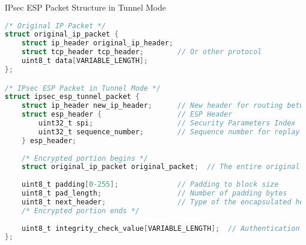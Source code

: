 \begin{code}{IPsec ESP Packet Structure in Tunnel Mode}\\
\begin{lstlisting}[language=C, style=basesmol]
/* Original IP Packet */
struct original_ip_packet {
    struct ip_header original_ip_header;
    struct tcp_header tcp_header;        // Or other protocol
    uint8_t data[VARIABLE_LENGTH];
};

/* IPsec ESP Packet in Tunnel Mode */
struct ipsec_esp_tunnel_packet {
    struct ip_header new_ip_header;      // New header for routing between gateways
    struct esp_header {                  // ESP Header
        uint32_t spi;                    // Security Parameters Index
        uint32_t sequence_number;        // Sequence number for replay protection
    } esp_header;
    
    /* Encrypted portion begins */
    struct original_ip_packet original_packet;  // The entire original packet
    
    uint8_t padding[0-255];              // Padding to block size
    uint8_t pad_length;                  // Number of padding bytes
    uint8_t next_header;                 // Type of the encapsulated header
    /* Encrypted portion ends */
    
    uint8_t integrity_check_value[VARIABLE_LENGTH];  // Authentication data
};
\end{lstlisting}
\end{code}

